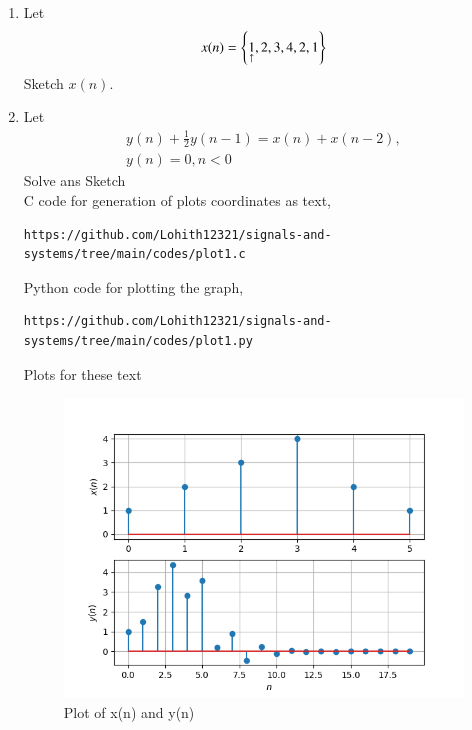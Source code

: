 \documentclass[journal,12pt,twocolumn]{IEEEtran}
\theoremstyle{remark}
\begin{document}
\begin{enumerate}[label=\thesection.\arabic*
,ref=\thesection.\theenumi]
\begin{enumerate}[label=\thesection.\arabic*
,ref=\thesection.\theenumi]
\section{Difference equation}
\item Let
\begin{equation}
x(n) = \left\{\underset{\uparrow}{1},2,3,4,2,1\right\} \label{prob:2.1}
\end{equation}
Sketch $x(n)$.\\ 
\item Let
\begin{multline}
y(n) + \frac{1}{2}y(n-1) = x(n) + x(n-2), 
\\
y(n) = 0, n < 0 \label{prob:2.2}
\end{multline}
Solve ans Sketch\\
\solution 
C code for generation of plots coordinates as text,\\
\begin{lstlisting}
https://github.com/Lohith12321/signals-and-systems/tree/main/codes/plot1.c    
\end{lstlisting}
Python code for plotting the graph,\\
\begin{lstlisting}
https://github.com/Lohith12321/signals-and-systems/tree/main/codes/plot1.py   
\end{lstlisting}
Plots for these text
\begin{figure}[ht]
    \centering  
\includegraphics[width=\columnwidth]{figs/plot1.png}
\begin{center}
    \caption{Plot of x(n) and y(n)}
\end{center}
    \label{fig:plot1}
\end{figure}
\end{enumerate}
\begin{enumerate}[label=\thesection.\arabic*
,ref=\thesection.\theenumi]

\end{enumerate}
\end{enumerate}
\end{document}
